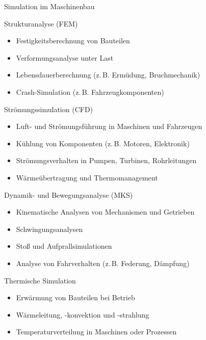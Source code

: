 \documentclass[xelatex,aspectratio=169]{beamer}
\begin{document}
\begin{frame}[allowframebreaks]{Simulation im Maschinenbau}

    \begin{block}{Strukturanalyse (FEM)}
        \begin{itemize}
            \item Festigkeitsberechnung von Bauteilen
            \item Verformungsanalyse unter Last
            \item Lebensdauerberechnung (z.\,B. Ermüdung, Bruchmechanik)
            \item Crash-Simulation (z.\,B. Fahrzeugkomponenten)
        \end{itemize}
    \end{block}

    \begin{block}{Strömungssimulation (CFD)}
        \begin{itemize}
            \item Luft- und Strömungsführung in Maschinen und Fahrzeugen
            \item Kühlung von Komponenten (z.\,B. Motoren, Elektronik)
            \item Strömungsverhalten in Pumpen, Turbinen, Rohrleitungen
            \item Wärmeübertragung und Thermomanagement
        \end{itemize}
    \end{block}

    \begin{block}{Dynamik- und Bewegungsanalyse (MKS)}
        \begin{itemize}
            \item Kinematische Analysen von Mechanismen und Getrieben
            \item Schwingungsanalysen
            \item Stoß und Aufprallsimulationen
            \item Analyse von Fahrverhalten (z.\,B. Federung, Dämpfung)
        \end{itemize}
    \end{block}

    \begin{block}{Thermische Simulation}
        \begin{itemize}
            \item Erwärmung von Bauteilen bei Betrieb
            \item Wärmeleitung, -konvektion und -strahlung
            \item Temperaturverteilung in Maschinen oder Prozessen
        \end{itemize}
    \end{block}


\end{frame}
\end{document}
